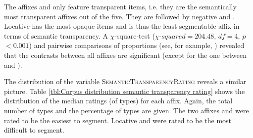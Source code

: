 \begin{table}
	\caption{Semantic Transparency by affix }
	\label{tbl:Corpus distribution semantic transparency}
	
\vspace*{-0.5cm}
	
\end{table}



The affixes  and  only feature transparent items, i.e. they are the semantically most transparent affixes out of the five. They are followed by negative  and . Locative  has the most opaque items and is thus the least segmentable affix in terms of semantic transparency.
 A $\chi$-square-test ($\chi$-$squared=204.48$, $df=4$, $p$ $< 0.001$) and  pairwise comparisons of proportions (see, for example, \citealt[chapter 6.5]{Crawley.2012}) revealed that the contrasts between all affixes are significant (except for the one between  and ).



The distribution of the variable \textsc{SemanticTransparencyRating} reveals a similar picture. Table \ref{tbl:Corpus distribution semantic transparency rating} shows the distribution of the median ratings (of types) for each affix. Again, the total number of types and the percentage of types are given. 
The two affixes  and  were rated to be the easiest to segment. Locative  and  were rated to be the most difficult to segment.
 


